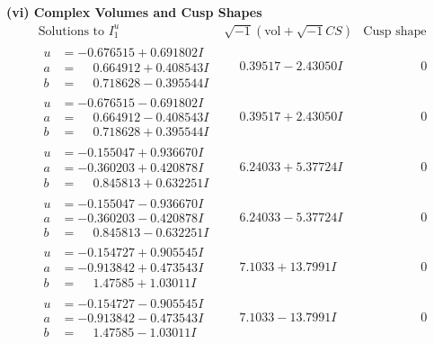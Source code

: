 \documentclass[1p]{elsarticle_modified}
\theoremstyle{definition}
\newcommand{\I}{\sqrt{-1}}
\begin{document}
\newpage\flushleft \textbf{(vi) Complex Volumes and Cusp Shapes}
$$\begin{array}{c|c|c}  
\text{Solutions to }I^u_{1}& \I (\text{vol} + \sqrt{-1}CS) & \text{Cusp shape}\\
 \hline 
\begin{aligned}
u &= -0.676515 + 0.691802 I \\
a &= \phantom{-}0.664912 + 0.408543 I \\
b &= \phantom{-}0.718628 - 0.395544 I\end{aligned}
 & \phantom{-}0.39517 - 2.43050 I & \phantom{-0.000000 } 0 \\ \hline\begin{aligned}
u &= -0.676515 - 0.691802 I \\
a &= \phantom{-}0.664912 - 0.408543 I \\
b &= \phantom{-}0.718628 + 0.395544 I\end{aligned}
 & \phantom{-}0.39517 + 2.43050 I & \phantom{-0.000000 } 0 \\ \hline\begin{aligned}
u &= -0.155047 + 0.936670 I \\
a &= -0.360203 + 0.420878 I \\
b &= \phantom{-}0.845813 + 0.632251 I\end{aligned}
 & \phantom{-}6.24033 + 5.37724 I & \phantom{-0.000000 } 0 \\ \hline\begin{aligned}
u &= -0.155047 - 0.936670 I \\
a &= -0.360203 - 0.420878 I \\
b &= \phantom{-}0.845813 - 0.632251 I\end{aligned}
 & \phantom{-}6.24033 - 5.37724 I & \phantom{-0.000000 } 0 \\ \hline\begin{aligned}
u &= -0.154727 + 0.905545 I \\
a &= -0.913842 + 0.473543 I \\
b &= \phantom{-}1.47585 + 1.03011 I\end{aligned}
 & \phantom{-}7.1033 + 13.7991 I & \phantom{-0.000000 } 0 \\ \hline\begin{aligned}
u &= -0.154727 - 0.905545 I \\
a &= -0.913842 - 0.473543 I \\
b &= \phantom{-}1.47585 - 1.03011 I\end{aligned}
 & \phantom{-}7.1033 - 13.7991 I & \phantom{-0.000000 } 0 \\ \hline\begin{aligned}

\end{aligned}
\end{array}$$
\end{document}
